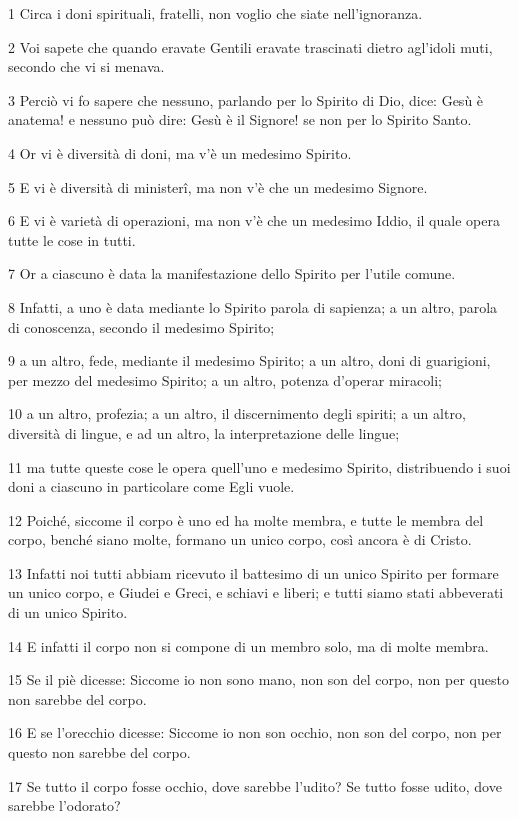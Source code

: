 \par 1 Circa i doni spirituali, fratelli, non voglio che siate nell'ignoranza.
\par 2 Voi sapete che quando eravate Gentili eravate trascinati dietro agl'idoli muti, secondo che vi si menava.
\par 3 Perciò vi fo sapere che nessuno, parlando per lo Spirito di Dio, dice: Gesù è anatema! e nessuno può dire: Gesù è il Signore! se non per lo Spirito Santo.
\par 4 Or vi è diversità di doni, ma v'è un medesimo Spirito.
\par 5 E vi è diversità di ministerî, ma non v'è che un medesimo Signore.
\par 6 E vi è varietà di operazioni, ma non v'è che un medesimo Iddio, il quale opera tutte le cose in tutti.
\par 7 Or a ciascuno è data la manifestazione dello Spirito per l'utile comune.
\par 8 Infatti, a uno è data mediante lo Spirito parola di sapienza; a un altro, parola di conoscenza, secondo il medesimo Spirito;
\par 9 a un altro, fede, mediante il medesimo Spirito; a un altro, doni di guarigioni, per mezzo del medesimo Spirito; a un altro, potenza d'operar miracoli;
\par 10 a un altro, profezia; a un altro, il discernimento degli spiriti; a un altro, diversità di lingue, e ad un altro, la interpretazione delle lingue;
\par 11 ma tutte queste cose le opera quell'uno e medesimo Spirito, distribuendo i suoi doni a ciascuno in particolare come Egli vuole.
\par 12 Poiché, siccome il corpo è uno ed ha molte membra, e tutte le membra del corpo, benché siano molte, formano un unico corpo, così ancora è di Cristo.
\par 13 Infatti noi tutti abbiam ricevuto il battesimo di un unico Spirito per formare un unico corpo, e Giudei e Greci, e schiavi e liberi; e tutti siamo stati abbeverati di un unico Spirito.
\par 14 E infatti il corpo non si compone di un membro solo, ma di molte membra.
\par 15 Se il piè dicesse: Siccome io non sono mano, non son del corpo, non per questo non sarebbe del corpo.
\par 16 E se l'orecchio dicesse: Siccome io non son occhio, non son del corpo, non per questo non sarebbe del corpo.
\par 17 Se tutto il corpo fosse occhio, dove sarebbe l'udito? Se tutto fosse udito, dove sarebbe l'odorato?
